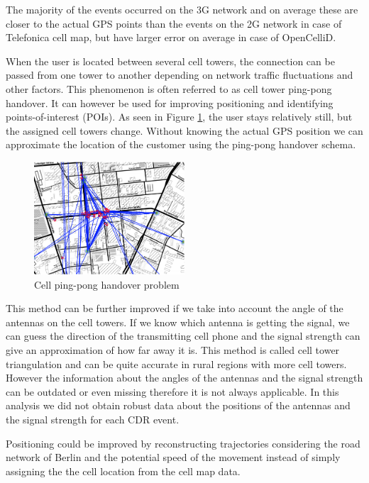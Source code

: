 The majority of the events occurred on the 3G network and on average these are closer to the actual GPS points than the events on the 2G network in case of Telefonica cell map, but have larger error on average in case of OpenCelliD.

When the user is located between several cell towers, the connection can be passed from one tower to another depending on network traffic fluctuations and other factors. This phenomenon is often referred to as cell tower ping-pong handover. It can however be used for improving positioning and identifying points-of-interest (POIs). As seen in Figure \ref{fig:ping-pong}, the user stays relatively still, but the assigned cell towers change. Without knowing the actual GPS position we can approximate the location of the customer using the ping-pong handover schema.

\begin{figure}[h]
    \centering
    \includegraphics[width=0.5\textwidth]{images/ping-pong.png}
    \caption{Cell ping-pong handover problem}
    \label{fig:ping-pong}
\end{figure}

This method can be further improved if we take into account the angle of the antennas on the cell towers. If we know which antenna is getting the signal, we can guess the direction of the transmitting cell phone and the signal strength can give an approximation of how far away it is. This method is called cell tower triangulation and can be quite accurate in rural regions with more cell towers. However the information about the angles of the antennas and the signal strength can be outdated or even missing therefore it is not always applicable. In this analysis we did not obtain robust data about the positions of the antennas and the signal strength for each CDR event.

Positioning could be improved by reconstructing trajectories considering the road network of Berlin and the potential speed of the movement instead of simply assigning the the cell location from the cell map data. 

